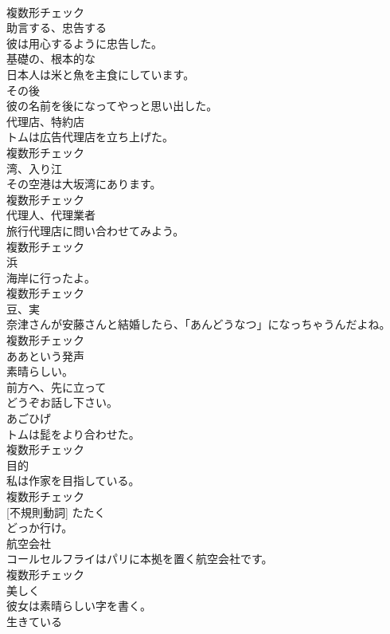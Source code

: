 \documentclass[8pt]{extreport}
\begin{document}
\begin{CJK}{UTF8}{min}
\\	複数形チェック
\\	[動詞]	助言する、忠告する	
\\	彼は用心するように忠告した。	
\\	[形容詞]	基礎の、根本的な	
\\	日本人は米と魚を主食にしています。	
\\	[副詞]	その後	
\\	彼の名前を後になってやっと思い出した。	
\\	[名詞]	代理店、特約店	
\\	トムは広告代理店を立ち上げた。	
\\	複数形チェック
\\	[名詞]	湾、入り江	
\\	その空港は大坂湾にあります。	
\\	複数形チェック
\\	[名詞]	代理人、代理業者	
\\	旅行代理店に問い合わせてみよう。	
\\	複数形チェック
\\	[名詞]	浜	
\\	海岸に行ったよ。	
\\	複数形チェック
\\	[名詞]	豆、実	
\\	奈津さんが安藤さんと結婚したら、「あんどうなつ」になっちゃうんだよね。	
\\	複数形チェック
\\	[感動詞]	ああという発声	
\\	素晴らしい。	
\\	[副詞]	前方へ、先に立って	
\\	どうぞお話し下さい。	
\\	[名詞]	あごひげ	
\\	トムは髭をより合わせた。	
\\	複数形チェック
\\	[名詞]	目的	
\\	私は作家を目指している。	
\\	複数形チェック
\\	[動詞] [不規則動詞]	たたく	
\\	どっか行け。	
\\	[名詞]	航空会社	
\\	コールセルフライはパリに本拠を置く航空会社です。	
\\	複数形チェック
\\	[副詞]	美しく	
\\	彼女は素晴らしい字を書く。	
\\	[形容詞]	生きている	

\end{CJK}
\end{document}
